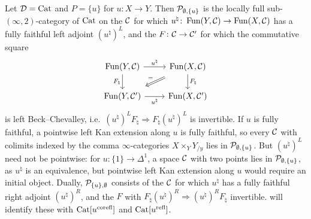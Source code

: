 \begin{exmp}
\label{ex:local-cat}
%
Let $\mathcal{D} = \mathrm{Cat}$ and $P = \{u\}$ for $u\colon X \to Y$. Then
$\mathcal{P}_{\emptyset,\{u\}}$
is the locally full sub-$(\infty,2)$-category of $\mathrm{Cat}$ on the $\mathcal{C}$ for which
$u^{\natural}\colon \operatorname{Fun}(Y,\mathcal{C}) \to \operatorname{Fun}(X,\mathcal{C})$
has a fully faithful left adjoint $(u^{\natural})^{L}$,
and the $F\colon \mathcal{C} \to \mathcal{C}'$ for which the commutative square
\begin{equation*}
\begin{tikzcd}
\func(Y,\C) \ar[r, "u^{\natural}"] \ar[d, "F_{\natural}"'] & \func(X,\C) \ar[d,
"F_{\natural}"] \ar[dl, Rightarrow, shorten=3mm, "="'] \\
\func(Y,\C') \ar[r, "u^{\natural}"'] & \func(X,\C')
\end{tikzcd}
\end{equation*}
is left Beck--Chevalley, i.e.\
$(u^{\natural})^{L}F_{\natural} \Rightarrow F_{\natural}(u^{\natural})^{L}$
is invertible.
If $u$ is fully faithful, a pointwise left Kan extension along $u$ is fully
faithful, so every $\mathcal{C}$ with colimits indexed by the comma $\infty$-categories
$X \times_{Y} Y_{/y}$ lies in
$\mathcal{P}_{\emptyset,\{u\}}$.
But $(u^{\natural})^{L}$ need not be pointwise: for
$u\colon \{1\} \to \Delta^{1}$,
a space $\mathcal{C}$ with two points lies in
$\mathcal{P}_{\emptyset,\{u\}}$,
as $u^{\natural}$ is an equivalence, but pointwise left Kan extension along $u$
would require an initial object.
Dually,
$\mathcal{P}_{\{u\},\emptyset}$
consists of the $\mathcal{C}$ for which $u^{\natural}$ has a fully faithful right adjoint
$(u^{\natural})^{R}$, and the $F$ with
$F_{\natural}(u^{\natural})^{R} \Rightarrow (u^{\natural})^{R}F_{\natural}$
invertible.
 will identify these with $\mathrm{Cat}[{u}^{\mathrm{corefl}}]$ and
$\mathrm{Cat}[{u}^{\mathrm{refl}}]$.
\end{exmp}
